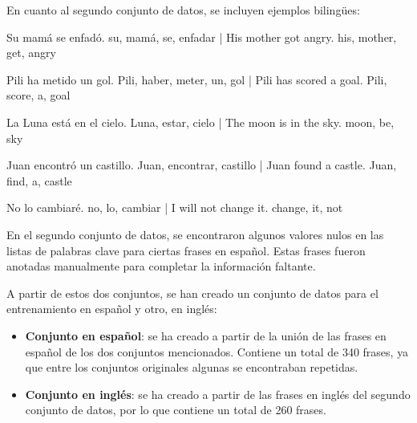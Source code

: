 \documentclass[11pt,spanish,listoffigures,listoftables]{tfgetsinf}
\begin{document}

En cuanto al segundo conjunto de datos, se incluyen ejemplos bilingües:


\begin{displayquote}

Su mamá se enfadó.	su, mamá, se, enfadar | His mother got angry.	his, mother, get, angry

Pili ha metido un gol.	Pili, haber, meter, un, gol | Pili has scored a goal.	Pili, score, a, goal 

La Luna está en el cielo.	Luna, estar, cielo | The moon is in the sky.	moon, be, sky 

Juan encontró un castillo.	Juan, encontrar, castillo | Juan found a castle.	Juan, find, a, castle 

No lo cambiaré.	no, lo, cambiar | I will not change it.	change, it, not  

\end{displayquote}

En el segundo conjunto de datos, se encontraron algunos valores nulos en las listas de palabras clave para ciertas frases en español. Estas frases fueron anotadas manualmente para completar la información faltante.

A partir de estos dos conjuntos, se han creado un conjunto de datos para el entrenamiento en español y otro, en inglés:

\begin{itemize}
	\item \textbf{Conjunto en español}: se ha creado a partir de la unión de las frases en español de los dos conjuntos mencionados. Contiene un total de 340 frases, ya que entre los conjuntos originales algunas se encontraban repetidas.
	\item \textbf {Conjunto en inglés}: se ha creado a partir de las frases en inglés del segundo conjunto de datos, por lo que contiene un total de 260 frases.
\end{itemize}
\end{document}
